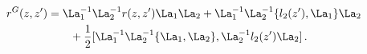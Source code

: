 \begin{equation}
\begin{split}
r^{G}(z,z')&=\La_1^{-1}\La_2^{-1}r(z,z')\La_1 \La_2
\label{rgauget}
+ \La_1^{-1}\La_2^{-1}\{l_2(z') ,\La_1\} \La_2   \\
&\qquad  + \frac12 [ \La_1^{-1}\La_2^{-1} \{\La_1 ,\La_2\},
\La_2^{-1} l_2(z') \La_2 ]\,.
\end{split}
\end{equation}

